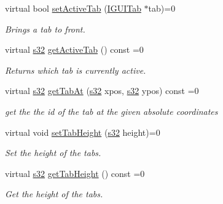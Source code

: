 \begin{DoxyCompactItemize}
virtual bool \hyperlink{classirr_1_1gui_1_1IGUITabControl_acea5fca2d2a883a450d4df823eea27d5}{set\+Active\+Tab} (\hyperlink{classirr_1_1gui_1_1IGUITab}{I\+G\+U\+I\+Tab} $\ast$tab)=0
\begin{DoxyCompactList}\small\item\em Brings a tab to front. \end{DoxyCompactList}\item 
\mbox{\label{classirr_1_1gui_1_1IGUITabControl_adc55d313131e214646c9f654e1319792}} 
virtual \hyperlink{namespaceirr_ac66849b7a6ed16e30ebede579f9b47c6}{s32} \hyperlink{classirr_1_1gui_1_1IGUITabControl_adc55d313131e214646c9f654e1319792}{get\+Active\+Tab} () const =0
\begin{DoxyCompactList}\small\item\em Returns which tab is currently active. \end{DoxyCompactList}\item 
virtual \hyperlink{namespaceirr_ac66849b7a6ed16e30ebede579f9b47c6}{s32} \hyperlink{classirr_1_1gui_1_1IGUITabControl_abe529c6da00af1e156357562eafec031}{get\+Tab\+At} (\hyperlink{namespaceirr_ac66849b7a6ed16e30ebede579f9b47c6}{s32} xpos, \hyperlink{namespaceirr_ac66849b7a6ed16e30ebede579f9b47c6}{s32} ypos) const =0
\begin{DoxyCompactList}\small\item\em get the the id of the tab at the given absolute coordinates \end{DoxyCompactList}\item 
\mbox{\label{classirr_1_1gui_1_1IGUITabControl_aaf32295663b656a48980ee113dd0251e}} 
virtual void \hyperlink{classirr_1_1gui_1_1IGUITabControl_aaf32295663b656a48980ee113dd0251e}{set\+Tab\+Height} (\hyperlink{namespaceirr_ac66849b7a6ed16e30ebede579f9b47c6}{s32} height)=0
\begin{DoxyCompactList}\small\item\em Set the height of the tabs. \end{DoxyCompactList}\item 
virtual \hyperlink{namespaceirr_ac66849b7a6ed16e30ebede579f9b47c6}{s32} \hyperlink{classirr_1_1gui_1_1IGUITabControl_aff6b4e0bd1a4b641fd0e3c73a0500d72}{get\+Tab\+Height} () const =0
\begin{DoxyCompactList}\small\item\em Get the height of the tabs. \end{DoxyCompactList}\item 

\end{DoxyCompactItemize}
